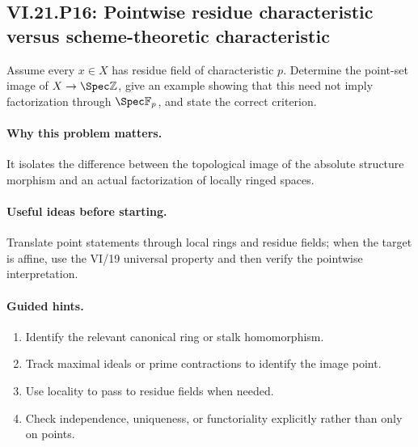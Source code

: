 \subsection*{VI.21.P16: Pointwise residue characteristic versus scheme-theoretic characteristic}
\begin{problem}\label{prob:vi21-p16}
Assume every $x\in X$ has residue field of characteristic $p$.  Determine the point-set image of $X\to\Spec\mathbb Z$, give an example showing that this need not imply factorization through $\Spec\mathbb F_p$, and state the correct criterion.
\end{problem}

\ifdefined\FullProblemDossiers
\paragraph{Why this problem matters.}
It isolates the difference between the topological image of the absolute structure morphism and an actual factorization of locally ringed spaces.

\paragraph{Useful ideas before starting.}
Translate point statements through local rings and residue fields; when the target is affine, use the VI/19 universal property and then verify the pointwise interpretation.

\paragraph{Guided hints.}
\begin{enumerate}
\item Identify the relevant canonical ring or stalk homomorphism.
\item Track maximal ideals or prime contractions to identify the image point.
\item Use locality to pass to residue fields when needed.
\item Check independence, uniqueness, or functoriality explicitly rather than only on points.
\end{enumerate}


